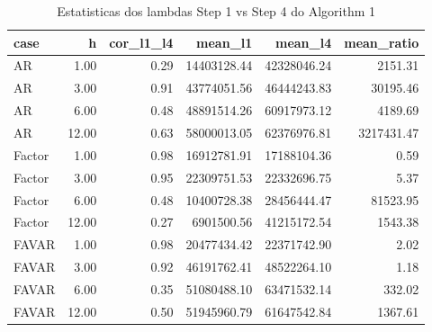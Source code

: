 \begin{table}[ht]
\centering
\begin{tabular}{lrrrrr}
  \hline
case & h & cor\_l1\_l4 & mean\_l1 & mean\_l4 & mean\_ratio \\ 
  \hline
AR & 1.00 & 0.29 & 14403128.44 & 42328046.24 & 2151.31 \\ 
  AR & 3.00 & 0.91 & 43774051.56 & 46444243.83 & 30195.46 \\ 
  AR & 6.00 & 0.48 & 48891514.26 & 60917973.12 & 4189.69 \\ 
  AR & 12.00 & 0.63 & 58000013.05 & 62376976.81 & 3217431.47 \\ 
  Factor & 1.00 & 0.98 & 16912781.91 & 17188104.36 & 0.59 \\ 
  Factor & 3.00 & 0.95 & 22309751.53 & 22332696.75 & 5.37 \\ 
  Factor & 6.00 & 0.48 & 10400728.38 & 28456444.47 & 81523.95 \\ 
  Factor & 12.00 & 0.27 & 6901500.56 & 41215172.54 & 1543.38 \\ 
  FAVAR & 1.00 & 0.98 & 20477434.42 & 22371742.90 & 2.02 \\ 
  FAVAR & 3.00 & 0.92 & 46191762.41 & 48522264.10 & 1.18 \\ 
  FAVAR & 6.00 & 0.35 & 51080488.10 & 63471532.14 & 332.02 \\ 
  FAVAR & 12.00 & 0.50 & 51945960.79 & 61647542.84 & 1367.61 \\ 
   \hline
\end{tabular}
\caption{Estatisticas dos lambdas Step 1 vs Step 4 do Algorithm 1} 
\label{tab:lambdas_stats}
\end{table}
